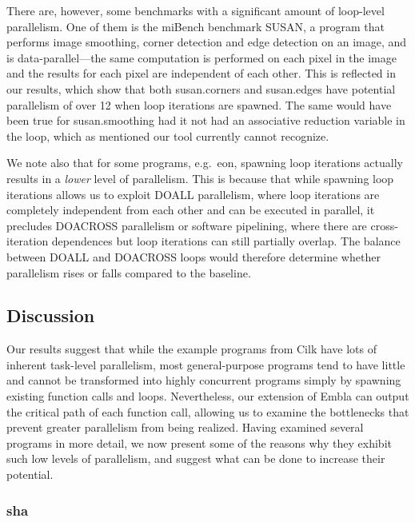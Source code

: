There are, however, some benchmarks with a significant amount of loop-level parallelism.
One of them is the miBench benchmark SUSAN, a program that performs image smoothing, corner detection and edge detection on an image, and is data-parallel---the same computation is performed on each pixel in the image and the results for each pixel are independent of each other.
This is reflected in our results, which show that both susan.corners and susan.edges have potential parallelism of over 12 when loop iterations are spawned.
The same would have been true for susan.smoothing had it not had an associative reduction variable in the loop, which as mentioned our tool currently cannot recognize.

We note also that for some programs, e.g.\ eon, spawning loop iterations actually results in a \emph{lower} level of parallelism.
This is because that while spawning loop iterations allows us to exploit DOALL parallelism, where loop iterations are completely independent from each other and can be executed in parallel, it precludes DOACROSS parallelism or software pipelining, where there are cross-iteration dependences but loop iterations can still partially overlap.
The balance between DOALL and DOACROSS loops would therefore determine whether parallelism rises or falls compared to the baseline.

\subsection{Discussion}

Our results suggest that while the example programs from Cilk have lots of inherent task-level parallelism, most general-purpose programs tend to have little and cannot be transformed into highly concurrent programs simply by spawning existing function calls and loops.
Nevertheless, our extension of Embla can output the critical path of each function call, allowing us to examine the bottlenecks that prevent greater parallelism from being realized.
Having examined several programs in more detail, we now present some of the reasons why they exhibit such low levels of parallelism, and suggest what can be done to increase their potential.

\subsubsection{sha}

